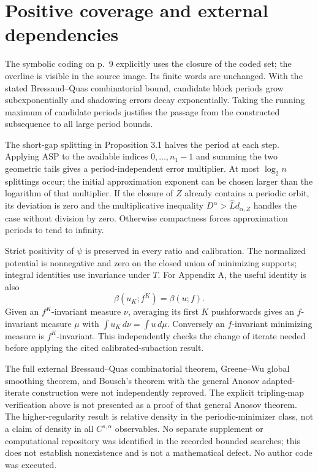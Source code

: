 \documentclass[10pt]{article}
\begin{document}
\section*{Positive coverage and external dependencies}
The symbolic coding on p. 9 explicitly uses the closure of the coded set; the overline is visible in the source image. Its finite words are unchanged. With the stated Bressaud–Quas combinatorial bound, candidate block periods grow subexponentially and shadowing errors decay exponentially. Taking the running maximum of candidate periods justifies the passage from the constructed subsequence to all large period bounds.\par
The short-gap splitting in Proposition 3.1 halves the period at each step. Applying ASP to the available indices \(0,\ldots,n_1-1\) and summing the two geometric tails gives a period-independent error multiplier. At most \(\log_2 n\) splittings occur; the initial approximation exponent can be chosen larger than the logarithm of that multiplier. If the closure of \(Z\) already contains a periodic orbit, its deviation is zero and the multiplicative inequality \(D^\alpha>\widehat Ld_{\alpha,Z}\) handles the case without division by zero. Otherwise compactness forces approximation periods to tend to infinity.\par
Strict positivity of \(\psi\) is preserved in every ratio and calibration. The normalized potential is nonnegative and zero on the closed union of minimizing supports; integral identities use invariance under \(T\). For Appendix A, the useful identity is also \[\beta(u_K;f^K)=\beta(u;f).\] Given an \(f^K\)-invariant measure \(\nu\), averaging its first \(K\) pushforwards gives an \(f\)-invariant measure \(\mu\) with \(\int u_K\,d\nu=\int u\,d\mu\). Conversely an \(f\)-invariant minimizing measure is \(f^K\)-invariant. This independently checks the change of iterate needed before applying the cited calibrated-subaction result.\par
The full external Bressaud–Quas combinatorial theorem, Greene–Wu global smoothing theorem, and Bousch’s theorem with the general Anosov adapted-iterate construction were not independently reproved. The explicit tripling-map verification above is not presented as a proof of that general Anosov theorem. The higher-regularity result is relative density in the periodic-minimizer class, not a claim of density in all \(C^{s,\alpha}\) observables. No separate supplement or computational repository was identified in the recorded bounded searches; this does not establish nonexistence and is not a mathematical defect. No author code was executed.\par
\end{document}
